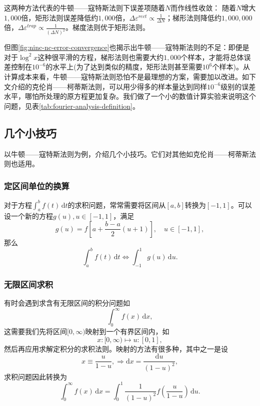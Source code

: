 这两种方法代表的牛顿——寇特斯法则下误差项随着$N$而作线性收敛：
随着$N$增大$1,000$倍，矩形法则误差降低约$1,000$倍，$\Delta \varepsilon^{rect} \propto \frac{1}{\Delta N}$；梯形法则降低约$1,000,000$倍，$\Delta \varepsilon^{trap} \propto \frac{1}{ \left(\Delta N \right)^{2}}$。梯度法则优于矩形法则。

但图\ref{fig:ninc-nc-error-convergence}也揭示出牛顿——寇特斯法则的不足：即便是对于$\log^{2} x$这种很平滑的方程，梯形法则也需要大约$1,000$个样本，才能将总体误差控制在$10^{-6}$的水平上(为了达到类似的精度，矩形法则甚至需要$10^{6}$个样本)。从计算成本来看，牛顿——寇特斯法则恐怕不是最理想的方案，需要加以改进。如下文介绍的克伦肖——柯蒂斯法则，可以用少得多的样本量达到同样$10^{-6}$级别的误差水平，哪怕所处理的原方程更加复杂。我们做了一个小的数值计算实验来说明这个问题，见表\ref{tab:fourier-analysis-definition}。

\subsection{几个小技巧}
\label{sec:ninc-tips}
以牛顿——寇特斯法则为例，介绍几个小技巧。它们对其他如克伦肖——柯蒂斯法则也适用。

\subsubsection{定区间单位的换算}
\label{sec:ninc-tips-improper-change}
对于方程$\int_{a}^{b} f(t) \, \mathrm{d} t$的求积问题，常常需要将区间从$[a,b]$转换为$[-1,1]$。可以设一个新的方程$g(u), u \in [-1,1]$，满足
\begin{equation}
  \label{eq:ninc-tips-improper-change}
  g(u) = f \left[ a + \frac{b-a}{2} \left( u + 1 \right) \right], \quad u \in [-1,1],
\end{equation}
那么
\begin{equation*}
  \int_{a}^{b} f(t) \, \mathrm{d} t \Leftrightarrow \int_{-1}^{1} g(u) \, \mathrm{d} u.
\end{equation*}

\subsubsection{无限区间求积}
\label{sec:ninc-tips-improper-integral}
有时会遇到求含有无限区间的积分问题如
\begin{equation*}
  \int_{0}^{\infty} f(x) \, \mathrm{d} x,
\end{equation*}
这需要我们先将区间$[0, \infty)$映射到一个有界区间内，如
\begin{equation*}
  x:[0, \infty) \mapsto u:[0,1],
\end{equation*}
然后再应用求解定积分的求积法则。映射的方法有很多种，其中之一是设
\begin{equation*}
  x \equiv \frac{u}{1-u}, \Rightarrow \mathrm{d} x = \frac{\mathrm{d} u}{\left( 1 - u \right)^{2}},
\end{equation*}
求积问题因此转换为
\begin{equation*}
  \int_{0}^{\infty} f(x) \, \mathrm{d} x = \int_{0}^{1} \frac{1}{\left( 1 - u \right)^{2}} f
  \left( \frac{u}{1 - u} \right) \, \mathrm{d} u.
\end{equation*}

